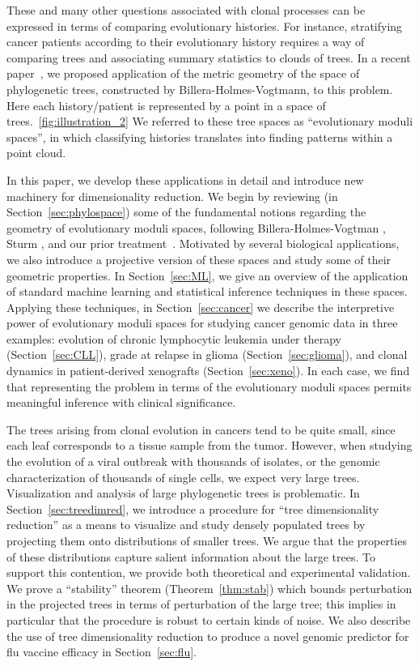 \documentclass[a4paper,11pt]{article}
\begin{document}
These and many other questions associated with clonal processes can be expressed in terms of comparing evolutionary histories.
For instance, stratifying cancer patients according to their evolutionary history requires a way of comparing trees and associating summary statistics to clouds of trees. 
In a recent paper~\cite{zairis2014moduli}, we proposed application of the metric geometry of the space of phylogenetic trees, constructed by Billera-Holmes-Vogtmann, to this problem. Here each history/patient is represented by a point in a space of trees.~\ref{fig:illustration_2}
We referred to these tree spaces as ``evolutionary moduli spaces'', in which classifying histories translates into finding patterns within a point cloud.

In this paper, we develop these applications in detail and introduce new machinery for dimensionality reduction.
We begin by reviewing (in Section~\ref{sec:phylospace}) some of the fundamental notions regarding the geometry of evolutionary moduli spaces, following Billera-Holmes-Vogtman \cite{billera2001geometry}, Sturm \cite{sturm2003probability}, and our prior treatment~\cite{zairis2014moduli}.
Motivated by several biological applications, we also introduce a projective version of these spaces and study some of their geometric properties.
In Section~\ref{sec:ML}, we give an overview of the application of standard machine learning and statistical inference techniques in these spaces.  Applying these techniques, in Section~\ref{sec:cancer} we describe the interpretive power of evolutionary moduli spaces for studying cancer genomic data in three examples: evolution of chronic lymphocytic leukemia under therapy (Section~\ref{sec:CLL}), grade at relapse in glioma (Section~\ref{sec:glioma}), and clonal dynamics in patient-derived xenografts (Section~\ref{sec:xeno}).  In each case, we find that representing the problem in terms of the evolutionary moduli spaces permits meaningful inference with clinical significance.

The trees arising from clonal evolution in cancers tend to be quite small, since each leaf corresponds to a tissue sample from the tumor.
However, when studying the evolution of a viral outbreak with thousands of isolates, or the genomic characterization of thousands of single cells, we expect very large trees.
Visualization and analysis of large phylogenetic trees is problematic.
In Section~\ref{sec:treedimred}, we introduce a procedure for ``tree dimensionality reduction'' as a means to visualize and study densely populated trees by projecting them onto distributions of smaller trees.
We argue that the properties of these distributions capture salient information about the large trees.
To support this contention, we provide both theoretical and experimental validation.
We prove a ``stability'' theorem (Theorem~\ref{thm:stab}) which bounds perturbation in the projected trees in terms of perturbation of the large tree; this implies in particular that the procedure is robust to certain kinds of noise.
We also describe the use of tree dimensionality reduction to produce a novel genomic predictor for flu vaccine efficacy in Section~\ref{sec:flu}.
\end{document}
